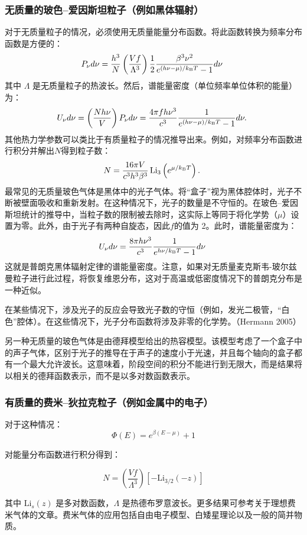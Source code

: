 \subsubsection{无质量的玻色–爱因斯坦粒子（例如黑体辐射）}  
对于无质量粒子的情况，必须使用无质量能量分布函数。将此函数转换为频率分布函数是方便的：
\[
P_{\nu} d\nu = \frac{h^3}{N} \left( \frac{Vf}{\Lambda^3} \right) \frac{1}{2} \frac{\beta^3 \nu^2}{e^{(h\nu - \mu) / k_{\rm B} T} - 1} d\nu~
\]
其中 \( \Lambda \) 是无质量粒子的热波长。然后，谱能量密度（单位频率单位体积的能量）为：
\[
U_{\nu} d\nu = \left( \frac{N h \nu}{V} \right) P_{\nu} d\nu = \frac{4 \pi f h \nu^3}{c^3} \frac{1}{e^{(h\nu - \mu) / k_{\rm B} T} - 1} d\nu.~
\]
其他热力学参数可以类比于有质量粒子的情况推导出来。例如，对频率分布函数进行积分并解出\(N\)得到粒子数：
\[
N = \frac{16 \pi V}{c^3 h^3 \beta^3} \, \mathrm{Li}_3 \left( e^{\mu / k_{\rm B} T} \right).~
\]
最常见的无质量玻色气体是黑体中的光子气体。将“盒子”视为黑体腔体时，光子不断被壁面吸收和重新发射。在这种情况下，光子的数量是不守恒的。在玻色–爱因斯坦统计的推导中，当粒子数的限制被去除时，这实际上等同于将化学势（\(\mu\)）设置为零。此外，由于光子有两种自旋态，因此\(f\)的值为 2。此时，谱能量密度为：
\[
U_{\nu} d\nu = \frac{8 \pi h \nu^3}{c^3} \frac{1}{e^{h\nu / k_{\rm B} T} - 1} d\nu~
\]
这就是普朗克黑体辐射定律的谱能量密度。注意，如果对无质量麦克斯韦-玻尔兹曼粒子进行此过程，将恢复维恩分布，这对于高温或低密度情况下的普朗克分布是一种近似。

在某些情况下，涉及光子的反应会导致光子数的守恒（例如，发光二极管，“白色”腔体）。在这些情况下，光子分布函数将涉及非零的化学势。（Hermann 2005）

另一种无质量的玻色气体是由德拜模型给出的热容模型。该模型考虑了一个盒子中的声子气体，区别于光子的推导在于声子的速度小于光速，并且每个轴向的盒子都有一个最大允许波长。这意味着，阶段空间的积分不能进行到无限大，而是结果将以相关的德拜函数表示，而不是以多对数函数表示。
\subsubsection{有质量的费米–狄拉克粒子（例如金属中的电子）}  
对于这种情况：
\[
\Phi(E) = e^{\beta (E - \mu)} + 1
\]

对能量分布函数进行积分得到：

\[
N = \left( \frac{Vf}{\Lambda^3} \right) \left[ -\text{Li}_{3/2}(-z) \right]
\]

其中 \( \text{Li}_s(z) \) 是多对数函数，\( \Lambda \) 是热德布罗意波长。更多结果可参考关于理想费米气体的文章。费米气体的应用包括自由电子模型、白矮星理论以及一般的简并物质。